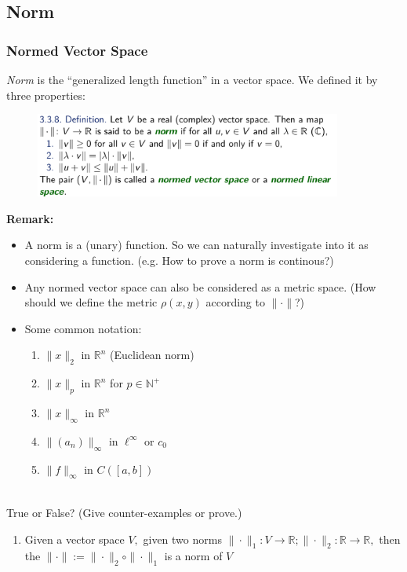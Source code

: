 \documentclass[10pt, t]{beamer}
\renewcommand{\emph}[1]{{\color{themecolor}\textsl{#1}}}
\newcommand{\N}{\mathbb{N}}
\newcommand{\R}{\mathbb{R}}
\newcommand{\nullspace}{~\\[15pt]}
\begin{document}
\subsection{Norm}
\begin{frame}[allowframebreaks]
    \frametitle{Normed Vector Space}

    \emph{Norm} is the ``generalized length function'' in a vector space. We defined it by three properties: 
    \begin{figure}[H]
        \centering
        \includegraphics[width=0.9\textwidth]{2020-11-17-20-13-44.png}
    \end{figure}
    \newpage
    \textbf{Remark:}\begin{itemize}
        \item A norm is a (unary) function. So we can naturally investigate into it as considering a function. (e.g. How to prove a norm is continous?)
        \item Any normed vector space can also be considered as a metric space. (How should we define the metric $\rho(x,y)$ according to $\|\cdot\|$?)
        \item Some common notation:\begin{enumerate}
            \item $\|x\|_2$ in $\R^n$ (Euclidean norm)
            \item $\|x\|_p$ in $\R^n$ for $p\in\N^+$
            \item $\|x\|_\infty$ in $\R^n$
            \item $\|(a_n)\|_\infty$ in $\ell^\infty$ or $c_0$
            \item $\|f\|_\infty$ in $C([a,b])$
        \end{enumerate}
    \end{itemize}\nullspace
    True or False? (Give counter-examples or prove.)
    \begin{enumerate}
        \item         Given a vector space $V,$ given two norms $\|\cdot\|_{1}: V \rightarrow \mathbb{R} ;\|\cdot\|_{2}: \mathbb{R} \rightarrow \mathbb{R},$ then the $\|\cdot\|:=\|\cdot\|_{2} \circ\|\cdot\|_{1}$ is a norm of $V$

    \end{enumerate}
\end{frame}
\end{document}
